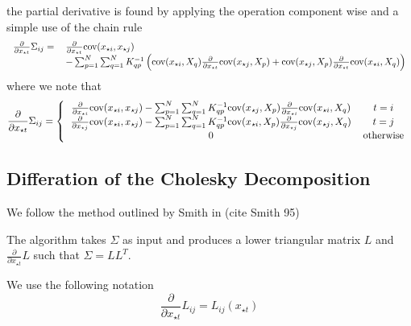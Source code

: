 \documentclass[phd,tocprelim]{cornell}
\begin{document}
the partial derivative is found by applying the operation component wise and a simple use of the chain rule
\begin{equation}
 \begin{tabular}{rl}
 $\frac{\partial}{\partial x_{\star t}} \Sigma_{ij} =$ & $\frac{\partial}{\partial x_{\star t}} \mbox{cov}(x_{\star i}, x_{\star j})$ \\
 & $- \sum_{p = 1}^{N} \sum_{q = 1}^{N} K^{-1}_{qp} \left( \mbox{cov}(x_{\star i}, X_{q}) \frac{\partial}{\partial x_{\star t}} \mbox{cov}(x_{\star j}, X_{p}) + \mbox{cov}(x_{\star j}, X_{p}) \frac{\partial}{\partial x_{\star t}} \mbox{cov}(x_{\star i}, X_{q}) \right)$
 \end{tabular}
\end{equation}
where we note that
\begin{equation}
    \frac{\partial}{\partial x_{\star t}} \Sigma_{ij} = \left\{ \begin{tabular}{cc}
                                                       $\frac{\partial}{\partial x_{\star i}} \mbox{cov}(x_{\star i}, x_{\star j}) - \sum_{p = 1}^{N} \sum_{q = 1}^{N} K^{-1}_{qp} \mbox{cov}(x_{\star j}, X_{p}) \frac{\partial}{\partial x_{\star i}} \mbox{cov}(x_{\star i}, X_{q})$ & $t = i$ \\
							$\frac{\partial}{\partial x_{\star j}} \mbox{cov}(x_{\star i}, x_{\star j}) - \sum_{p = 1}^{N} \sum_{q = 1}^{N} K^{-1}_{qp} \mbox{cov}(x_{\star i}, X_{p}) \frac{\partial}{\partial x_{\star j}} \mbox{cov}(x_{\star j}, X_{q})$ & $t = j$ \\
							$0$ & otherwise
                                                      \end{tabular} \right.
\end{equation}

\subsection{Differation of the Cholesky Decomposition}

We follow the method outlined by Smith in (cite Smith 95)

The algorithm takes $\Sigma$ as input and produces a lower triangular matrix $L$ and $\frac{\partial}{\partial x_{\star t}} L$ such that $\Sigma = LL^{T}$.

We use the following notation
\begin{equation}
    \frac{\partial}{\partial x_{\star t}} L_{ij} = L_{ij} (x_{\star t})
\end{equation}
\end{document}
